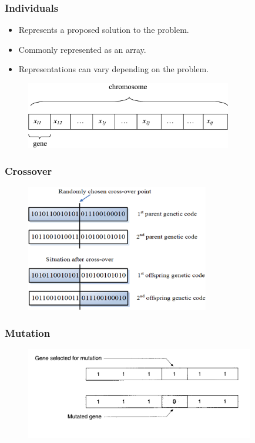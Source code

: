 \documentclass{beamer}
\begin{document}
\begin{frame}

	\frametitle{Individuals}

	\begin{itemize}
		\item Represents a proposed solution to the problem.
		\item Commonly represented as an array.
		\item Representations can vary depending on the problem.
	\end{itemize}

	\begin{figure}
		\includegraphics[width=90mm]{resources/chromosome.png}
	\end{figure}

\end{frame}

\begin{frame}

	\frametitle{Crossover}

	\begin{figure}
		\includegraphics[width=80mm]{resources/crossover.png}
	\end{figure}

\end{frame}

\begin{frame}

	\frametitle{Mutation}

	\begin{figure}
		\includegraphics[width=100mm]{resources/mutation2.png}
	\end{figure}

\end{frame}
\end{document}
